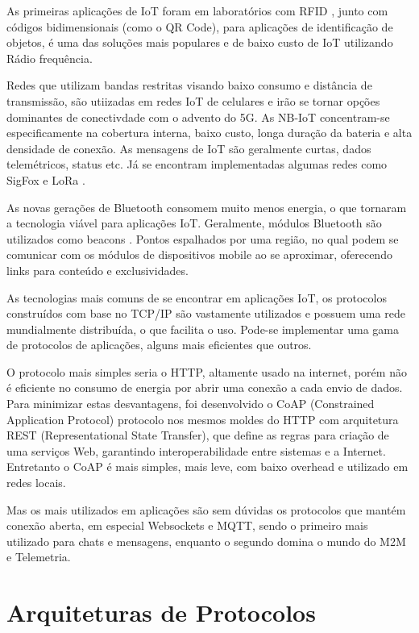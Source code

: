 As primeiras aplicações de IoT foram em laboratórios com RFID \cite{Rampim:iot}, junto com códigos bidimensionais (como o QR Code), para aplicações de identificação de objetos, é uma das soluções mais populares e de baixo custo de IoT utilizando Rádio frequência.

Redes que utilizam bandas restritas visando baixo consumo e distância de transmissão, são utiizadas em redes IoT de celulares e irão se tornar opções dominantes de conectivdade com o advento do 5G. As NB-IoT concentram-se especificamente na cobertura interna, baixo custo, longa duração da bateria e alta densidade de conexão. As mensagens de IoT são geralmente curtas, dados telemétricos, status etc. Já se encontram implementadas algumas redes como SigFox \cite{Sigfox} e LoRa \cite{LoRa}. 

As novas gerações de Bluetooth consomem muito menos energia, o que tornaram a tecnologia viável para aplicações IoT. Geralmente, módulos Bluetooth são utilizados como beacons \cite{Endeavor:Beacons}. Pontos espalhados por uma região, no qual podem se comunicar com os módulos de dispositivos mobile ao se aproximar, oferecendo links para conteúdo e exclusividades.

As tecnologias mais comuns de se encontrar em aplicações IoT, os protocolos construídos com base no TCP/IP são vastamente utilizados e possuem uma rede mundialmente distribuída, o que facilita o uso. Pode-se implementar uma gama de protocolos de aplicações, alguns mais eficientes que outros.

O protocolo mais simples seria o HTTP, altamente usado na internet, porém não é eficiente no consumo de energia por abrir uma conexão a cada envio de dados. Para minimizar estas desvantagens, foi desenvolvido o CoAP (Constrained Application Protocol) \cite{coap} protocolo nos mesmos moldes do HTTP com arquitetura REST (Representational State Transfer), que define as regras para criação de uma serviços Web, garantindo interoperabilidade entre sistemas e a Internet. Entretanto o CoAP é mais simples, mais leve, com baixo overhead e utilizado em redes locais.

Mas os mais utilizados em aplicações são sem dúvidas os protocolos que mantém conexão aberta, em especial Websockets \cite{websocket} e MQTT, sendo o primeiro mais utilizado para chats e mensagens, enquanto o segundo domina o mundo do M2M e Telemetria.


\section{Arquiteturas de Protocolos}
\label{section:arquitetura_protocolo}


